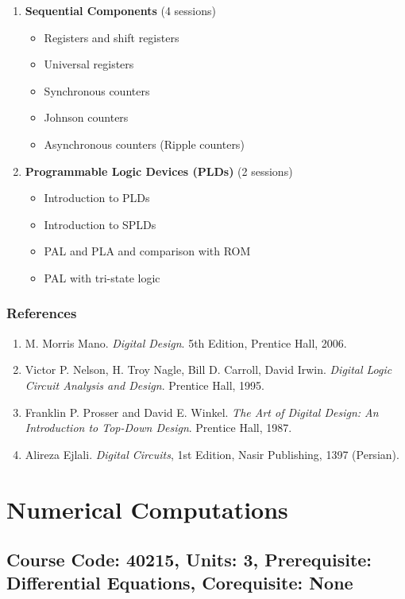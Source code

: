 \documentclass[12pt]{article}
\begin{document}
\begin{enumerate}
    \item \textbf{Sequential Components} (4 sessions)
        \begin{itemize}
            \item Registers and shift registers
            \item Universal registers
            \item Synchronous counters
            \item Johnson counters
            \item Asynchronous counters (Ripple counters)
        \end{itemize}

    \item \textbf{Programmable Logic Devices (PLDs)} (2 sessions)
        \begin{itemize}
            \item Introduction to PLDs
            \item Introduction to SPLDs
            \item PAL and PLA and comparison with ROM
            \item PAL with tri-state logic
        \end{itemize}
\end{enumerate}

\subsubsection*{References}
\begin{enumerate}
    \item M. Morris Mano. \textit{Digital Design}. 5th Edition, Prentice Hall, 2006.
    \item Victor P. Nelson, H. Troy Nagle, Bill D. Carroll, David Irwin. \textit{Digital Logic Circuit Analysis and Design}. Prentice Hall, 1995.
    \item Franklin P. Prosser and David E. Winkel. \textit{The Art of Digital Design: An Introduction to Top-Down Design}. Prentice Hall, 1987.
    \item Alireza Ejlali. \textit{Digital Circuits}, 1st Edition, Nasir Publishing, 1397 (Persian).
\end{enumerate}

\newpage

\section{Numerical Computations}
\subsection*{Course Code: 40215, Units: 3, Prerequisite: Differential Equations, Corequisite: None}
\end{document}
